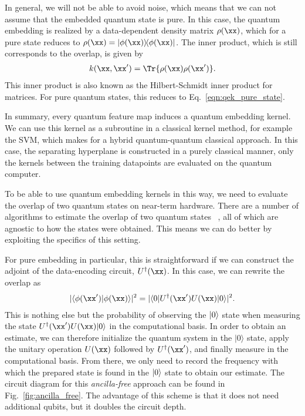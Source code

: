 \documentclass[twocolumn,superscriptaddress,nofootinbib]{revtex4-2}
\providecommand{\abs}[1]{\lvert #1 \rvert}
\newcommand{\dyad}[2]{|#1\rangle \! \langle #2|}
\begin{document}
In general, we will not be able to avoid noise, which means that we can not assume that the embedded quantum state is pure. In this case, the quantum embedding is realized by a data-dependent density matrix $\rho(\xx)$, which for a pure state reduces to $\rho(\xx) = \dyad{\phi(\xx)}{\phi(\xx)}$. The inner product, which is still corresponds to the overlap, is given by
\begin{align}\label{eqn:qek_mixed_state}
    k(\xx,\xx') = \Tr\{\rho(\xx)\rho(\xx')\}.
\end{align}
This inner product is also known as the Hilbert-Schmidt inner product for matrices. For pure quantum states, this reduces to Eq.~\eqref{eqn:qek_pure_state}.

In summary, every quantum feature map induces a quantum embedding kernel. We can use this kernel as a subroutine in a classical kernel method, for example the \ac{SVM}, which makes for a hybrid quantum-quantum classical approach. In this case, the separating hyperplane is constructed in a purely classical manner, only the kernels between the training datapoints are evaluated on the quantum computer. 

To be able to use quantum embedding kernels in this way, we need to evaluate the overlap of two quantum states on near-term hardware. There are a number of algorithms to estimate the overlap of two quantum states ~\cite{fanizzaSwapTestOptimal2020,buhrman2001QuantumFingerprinting,Cincio2018LearningAlgorithmStateOverlap,huang2020predicting}, all of which are agnostic to how the states were obtained. This means we can do better by exploiting the specifics of this setting.

For pure embedding in particular, this is straightforward if we can construct the adjoint of the data-encoding circuit, $U^\dagger(\xx)$. In this case, we can rewrite the overlap as
\begin{align}\label{eq:ancilla_free}
    \abs{\braket{\phi(\xx')|\phi(\xx)}}^2 = \abs{\braket{0|U^\dagger(\xx')U(\xx)|0}}^2.
\end{align}
This is nothing else but the probability of observing the $\ket{0}$ state when measuring the state $U^\dagger(\xx')U(\xx)|0\rangle$ in the computational basis.
In order to obtain an estimate, we can therefore initialize the quantum system in the $|0\rangle$ state, apply the unitary operation $U(\xx)$ followed by $U^\dagger(\xx')$, and finally measure in the computational basis.
From there, we only need to record the frequency with which the prepared state is found in the $\ket{0}$ state to obtain our estimate.
The circuit diagram for this \emph{ancilla-free} approach can be found in Fig.~\ref{fig:ancilla_free}. The advantage of this scheme is that it does not need additional qubits, but it doubles the circuit depth.
\end{document}

